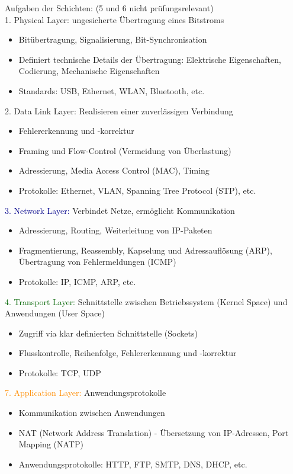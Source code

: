 \begin{KR}{Aufgaben der Schichten:} (5 und 6 nicht prüfungsrelevant)\\
    \textcolor{darkcorn}{1. Physical Layer:} ungesicherte Übertragung eines Bitstroms
    \begin{itemize}
        \item Bitübertragung, Signalisierung, Bit-Synchronisation
        \item Definiert technische Details der Übertragung: 
        Elektrische Eigenschaften, 
        Codierung, 
        Mechanische Eigenschaften
        \item Standards: USB, Ethernet, WLAN, Bluetooth, etc.
    \end{itemize}
    \textcolor{darkpurple}{2. Data Link Layer:} Realisieren einer zuverlässigen Verbindung
    \begin{itemize}
        \item Fehlererkennung und -korrektur
        \item Framing und Flow-Control (Vermeidung von Überlastung) 
        \item Adressierung, Media Access Control (MAC), Timing
        \item Protokolle: Ethernet, VLAN, Spanning Tree Protocol (STP), etc.
    \end{itemize}
    \textcolor{darkblue}{3. Network Layer:} Verbindet Netze, ermöglicht Kommunikation
    \begin{itemize}
        \item Adressierung, Routing, Weiterleitung von IP-Paketen
        \item Fragmentierung, Reassembly, Kapselung und Adressauflösung (ARP), Übertragung von Fehlermeldungen (ICMP)
        \item Protokolle: IP, ICMP, ARP, etc.
    \end{itemize}
    \textcolor{darkgreen}{4. Transport Layer:} Schnittstelle zwischen Betriebssystem (Kernel Space) und Anwendungen (User Space)
    \begin{itemize}
        \item Zugriff via klar definierten Schnittstelle (Sockets)
        \item Flusskontrolle, Reihenfolge, Fehlererkennung und -korrektur
        \item Protokolle: TCP, UDP
    \end{itemize}
    \textcolor{darkorange}{7. Application Layer:} Anwendungsprotokolle 
    \begin{itemize}
        \item Kommunikation zwischen Anwendungen
        \item NAT (Network Address Translation) - Übersetzung von IP-Adressen, Port Mapping (NATP)
        \item Anwendungsprotokolle: HTTP, FTP, SMTP, DNS, DHCP, etc.
    \end{itemize}
\end{KR}




 
    
 